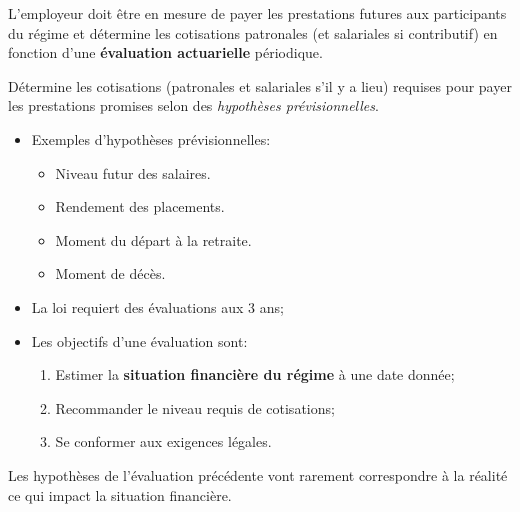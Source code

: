 \documentclass[10pt, french]{article}
\begin{document}
\begin{multicols*}{3}
L'employeur doit être en mesure de payer les prestations futures aux participants du régime et détermine les cotisations patronales (et salariales si contributif) en fonction d'une \textbf{évaluation actuarielle} périodique. 


\begin{definitionNOHFILLsub}
Détermine les cotisations (patronales et salariales s'il y a lieu) requises pour payer les prestations promises selon des \textit{hypothèses prévisionnelles}.

\begin{itemize}[leftmargin = *]
	\item	Exemples d'hypothèses prévisionnelles:
		\begin{itemize}[leftmargin = *]
		\item	Niveau futur des salaires.
		\item	Rendement des placements.
		\item	Moment du départ à la retraite.
		\item	Moment de décès.
		\end{itemize}
	\item	La loi requiert des évaluations aux 3 ans;
	\item	Les objectifs d'une évaluation sont:
		\begin{enumerate}
		\item	Estimer la \textbf{situation financière du régime} à une date donnée;
		\item	Recommander le niveau requis de cotisations;
		\item	Se conformer aux exigences légales.
		\end{enumerate}
\end{itemize}
\end{definitionNOHFILLsub}

\begin{definitionNOHFILLsub}
Les hypothèses de l'évaluation précédente vont rarement correspondre à la réalité ce qui impact la situation financière.\\


\end{definitionNOHFILLsub}
\end{multicols*}
\end{document}
